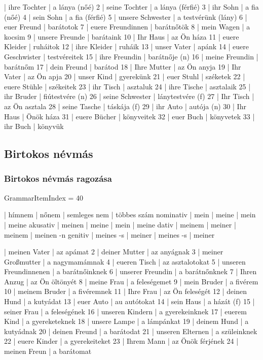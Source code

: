 \documentclass{article}
\newenvironment{desc}{\verbatim}{\endverbatim}
\newenvironment{exmp}{\verbatim}{\endverbatim}
\begin{document}
\begin{exmp}
1 | ihre Tochter | a lánya (nőé)
2 | seine Tochter | a lánya (férfié)
3 | ihr Sohn | a fia (nőé)
4 | sein Sohn | a fia (férfié)
5 | unsere Schwester | a testvérünk (lány)
6 | euer Freund | barátotok
7 | euere Freundinnen | barátnőtök
8 | mein Wagen | a kocsim
9 | unsere Freunde | barátaink
10 | Ihr Haus | az Ön háza
11 | euere Kleider | ruháitok
12 | ihre Kleider | ruháik
13 | unser Vater | apánk
14 | euere Geschwister | testvéreitek
15 | ihre Freundin | barátnője (n)
16 | meine Freundin | barátnőm
17 | dein Freund | barátod
18 | Ihre Mutter | az Ön anyja
19 | Ihr Vater | az Ön apja
20 | unser Kind | gyerekünk
21 | euer Stuhl | széketek
22 | euere Stühle | székeitek
23 | ihr Tisch | asztaluk
24 | ihre Tische | asztalaik
25 | ihr Bruder | fiútestvére (n)
26 | seine Schwester | lánytestvére (f)
27 | Ihr Tisch | az Ön asztala
28 | seine Tasche | táskája (f)
29 | ihr Auto | autója (n)
30 | Ihr Haus | Önök háza
31 | euere Bücher | könyveitek
32 | euer Buch | könyvetek
33 | ihr Buch | könyvük
\end{exmp}

\subsection{Birtokos névmás}

\subsubsection{Birtokos névmás ragozása}

GrammarItemIndex = 40

\begin{desc}
          | hímnem    | nőnem  | semleges nem | többes szám 
nominativ | mein      | meine  | mein         | meine 
akusativ  | meinen    | meine  | mein         | meine 
dativ     | meinem    | meiner | meinem       | meinen -n 
genitiv   | meines -s | meiner | meines -s    | meiner 
\end{desc}

\begin{exmp}
1 | meinen Vater | az apámat
2 | deiner Mutter | az anyágnak
3 | meiner Großmutter | a nagymamámnak
4 | eueren Tisch | az asztalotokat
5 | unseren Freundinnenen | a barátnőinknek
6 | unserer Freundin | a barátnőnknek
7 | Ihren Anzug | az Ön öltönyét
8 | meine Frau | a feleségemet
9 | mein Bruder | a fivérem
10 | meinem Bruder | a fivéremnek
11 | Ihre Frau | az Ön feleségét
12 | deinen Hund | a kutyádat
13 | euer Auto | au autótokat
14 | sein Haus | a házát (f)
15 | seiner Frau | a feleségének
16 | unseren Kindern | a gyerekeinknek
17 | euerem Kind | a gyereketeknek
18 | unsere Lampe | a lámpánkat
19 | deinem Hund | a kutyádnak
20 | deinen Freund | a barátodat
21 | unseren Elternen | a szüleinknek
22 | euere Kinder | a gyerekeiteket
23 | Ihrem Mann | az Önök férjének
24 | meinen Freun | a barátomat
\end{exmp}
\end{document}
